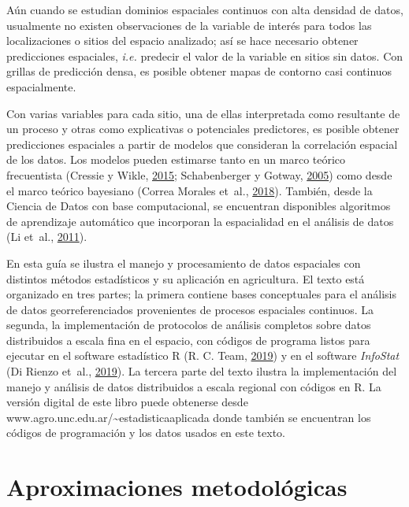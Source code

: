 \documentclass[11pt,b5paper,]{krantz}
\begin{document}
Aún cuando se estudian dominios espaciales continuos con alta densidad de datos, usualmente no existen observaciones de la variable de interés para todos las localizaciones o sitios del espacio analizado; así se hace necesario obtener predicciones espaciales, \emph{i.e.} predecir el valor de la variable en sitios sin datos. Con grillas de predicción densa, es posible obtener mapas de contorno casi continuos espacialmente.

Con varias variables para cada sitio, una de ellas interpretada como resultante de un proceso y otras como explicativas o potenciales predictores, es posible obtener predicciones espaciales a partir de modelos que consideran la correlación espacial de los datos. Los modelos pueden estimarse tanto en un marco teórico frecuentista (Cressie y Wikle, \protect\hyperlink{ref-Cressie_Wikle_2015}{2015}; Schabenberger y Gotway, \protect\hyperlink{ref-Schabenberger_Gotway_2005}{2005}) como desde el marco teórico bayesiano (Correa Morales et~al., \protect\hyperlink{ref-Correa_Morales_Causil_Javier_2018}{2018}). También, desde la Ciencia de Datos con base computacional, se encuentran disponibles algoritmos de aprendizaje automático que incorporan la espacialidad en el análisis de datos (Li et~al., \protect\hyperlink{ref-Li_Heap_Potter_Daniell_2011}{2011}).

En esta guía se ilustra el manejo y procesamiento de datos espaciales con distintos métodos estadísticos y su aplicación en agricultura. El texto está organizado en tres partes; la primera contiene bases conceptuales para el análisis de datos georreferenciados provenientes de procesos espaciales continuos. La segunda, la implementación de protocolos de análisis completos sobre datos distribuidos a escala fina en el espacio, con códigos de programa listos para ejecutar en el software estadístico R (R. C. Team, \protect\hyperlink{ref-R_Core_Team_2019}{2019}) y en el software \emph{InfoStat} (Di Rienzo et~al., \protect\hyperlink{ref-Di_Rienzo_Casanoves_Balzarini_Gonzalez_Tablada_Robledo_2019}{2019}). La tercera parte del texto ilustra la implementación del manejo y análisis de datos distribuidos a escala regional con códigos en R. La versión digital de este libro puede obtenerse desde www.agro.unc.edu.ar/\textasciitilde{}estadisticaaplicada donde también se encuentran los códigos de programación y los datos usados en este texto.

\mainmatter

\cleardoublepage

\hypertarget{part-aproximaciones-metodoluxf3gicas}{%
\part{Aproximaciones metodológicas}\label{part-aproximaciones-metodoluxf3gicas}}
\end{document}
